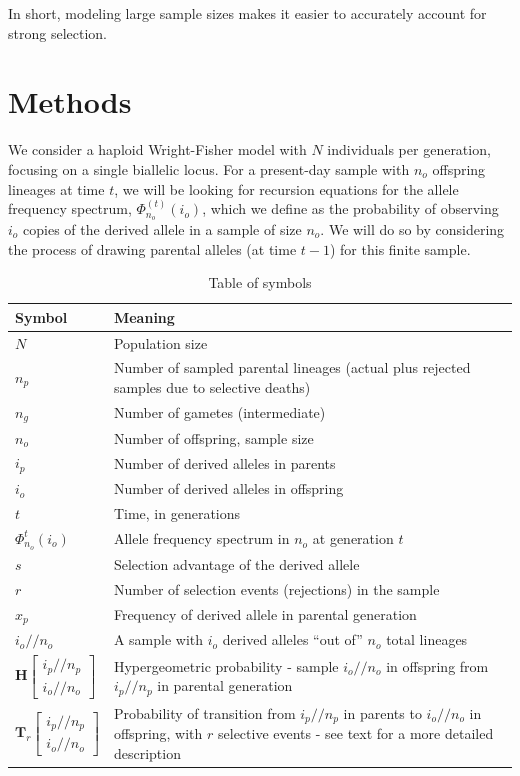 \documentclass[review]{elsarticle}
\newcommand{\afs}[2]{\Phi_{#1}^{(#2)}}
\newcommand{\dslash}{/\!\!/}
\newcommand{\Coalc}[4]{\begin{bmatrix}#1\dslash #2 \\ #3\dslash #4 \end{bmatrix}}
\begin{document}
In short, modeling large sample sizes makes it easier to accurately account for strong selection. 


\section{Methods}
\label{sec_methods}

We consider a haploid Wright-Fisher model with $N$ individuals per generation, focusing on a single
biallelic locus. For a present-day sample with $n_o$ offspring lineages at time $t$, we will be
looking for recursion equations for the allele frequency spectrum, $\afs{n_o}{t}(i_o)$, which we
define as the probability of observing $i_o$ copies of the derived allele in a sample of size $n_o$.
We will do so by considering the process of drawing parental alleles (at time $t-1$) for this finite
sample.
\begin{table}
  \centering
  \begin{tabular}{l|p{100mm}}
    Symbol & Meaning\\
    \hline
    $N$ & Population size\\
    $n_p$ & Number of sampled parental lineages (actual plus rejected samples due to selective deaths)\\
    $n_g$ & Number of gametes (intermediate)\\
    $n_o$ & Number of offspring, sample size\\
    $i_p$ & Number of derived alleles in parents\\
    $i_o$ & Number of derived alleles in offspring\\
    $t$ & Time, in generations\\
    $\Phi_{n_o}^{t}(i_o)$ & Allele frequency spectrum in $n_o$ at generation $t$\\
    $s$ & Selection advantage of the derived allele\\
    $r$ & Number of selection events (rejections) in the sample\\
    $x_p$ & Frequency of derived allele in parental generation\\
    $i_o \dslash n_o$ & A sample with $i_o$ derived alleles ``out of'' $n_o$ total lineages\\
    $\mathbf{H}\Coalc{i_p}{n_p}{i_o}{n_o}$ & Hypergeometric probability -
                                             sample $i_o \dslash n_o$ in offspring from $i_p \dslash n_p$ in parental generation\\
    $\mathbf{T}_{r}\Coalc{i_p}{n_p}{i_o}{n_o}$ & Probability of transition from $i_p \dslash n_p$ in parents
                                                 to $i_o \dslash n_o$ in offspring, with $r$ selective events -
                                                 see text for a more detailed description\\
  \end{tabular}
  \caption{\label{tab_symbols} Table of symbols}
\end{table}
\end{document}
